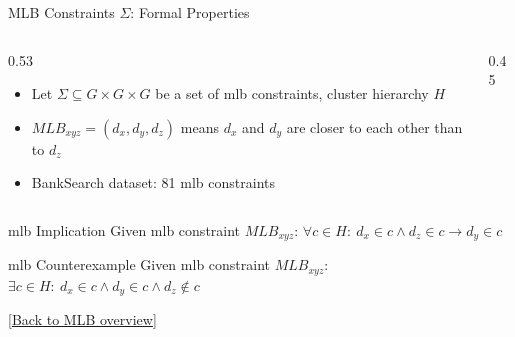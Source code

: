 \begin{frame}{MLB Constraints $\Sigma$: Formal Properties}
\hypertarget{appendix:mlb-defs}{}

\begin{columns}[T,onlytextwidth]
\begin{column}{0.53\textwidth}
\begin{itemize}
    \item Let $\Sigma \subseteq G \times G \times G$ be a set of \ac{mlb} constraints, cluster hierarchy $H$
    \item $MLB_{x y z}=(d_x,d_y,d_z)$ means $d_x$ and $d_y$ are closer to each other than to $d_z$
    \item BankSearch dataset: 81 \ac{mlb} constraints
\end{itemize}
\end{column}
\begin{column}{0.45\textwidth}
\banksearchHierarchyToMLB{}
\end{column}
\end{columns}

\begin{block}{\ac{mlb} Implication}
Given \ac{mlb} constraint $MLB_{x y z}$:
$\forall c \in H:\ d_x \in c \wedge d_z \in c \rightarrow d_y \in c$
\end{block}

\begin{block}{\ac{mlb} Counterexample}
Given \ac{mlb} constraint $MLB_{x y z}$:
$\exists c \in H:\ d_x \in c \wedge d_y \in c \wedge d_z \notin c$
\end{block}

\vfill
{\tiny[\hyperlink{main:mlb-constraints}{Back to MLB overview}]}
\end{frame}

